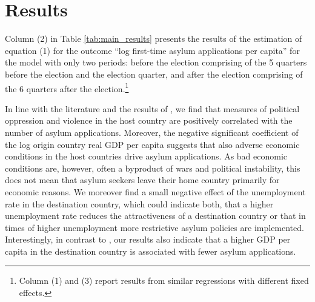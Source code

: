 \documentclass[a4paper,12pt]{article}
\begin{document}
\section{Results} \label{sec:results}
  Column (2) in Table \ref{tab:main_results} presents the results of the estimation of equation (1) for the outcome ``log first-time asylum applications per capita'' for the model with only two periods: before the election comprising of the 5 quarters before the election and the election quarter, and after the election comprising of the 6 quarters after the election.\footnote{Column (1) and (3) report results from similar regressions with different fixed effects.}  
  
 In line with the literature and the results of \citet{hatton2016}, we find that measures of political oppression and violence in the host country are positively correlated with the number of asylum applications. Moreover, the negative significant coefficient of the log origin country real GDP per capita suggests that also adverse economic conditions in the host countries drive asylum applications. As bad economic conditions are, however, often a byproduct of wars and political instability, this does not mean that asylum seekers leave their home country primarily for economic reasons. We moreover find a small negative effect of the unemployment rate in the destination country, which could indicate both, that a higher unemployment rate reduces the attractiveness of a destination country or that in times of higher unemployment more restrictive asylum policies are implemented. Interestingly, in contrast to \citet{hatton2016}, our results also indicate that a higher GDP per capita in the destination country is associated with fewer asylum applications. 
% 
% 
\end{document}
